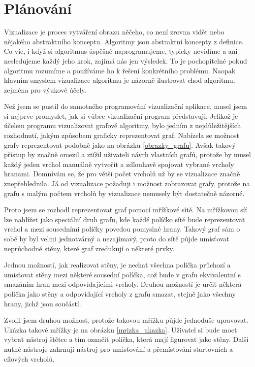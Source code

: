 \documentclass[12pt]{report}			%
\begin{document}

		\chapter{Plánování}
			Vizualizace je proces vytváření obrazu něčeho, co není zrovna vidět nebo nějakého abstraktního konceptu. Algoritmy jsou abstraktní koncepty z definice. Co víc, i když si algoritmus úspěšně naprogramujeme, typicky nevidíme a ani nesledujeme každý jeho krok, zajímá nás jen výsledek. To je pochopitelné pokud algoritmu rozumíme a používáme ho k řešení konkrétního problému. Naopak hlavním smyslem vizualizace algoritmu je názorně ilustrovat chod algoritmu, zejména pro výukové účely.
			
			Než jsem se pustil do samotného programování vizualizační aplikace, musel jsem si nejprve promyslet, jak si vůbec vizualizační program představuji. 
			Jelikož je účelem programu vizualizovat grafové algoritmy, bylo jedním z nejdůležitějších rozhodnutí, jakým způsobem graficky reprezentovat graf. Nabízela se možnost grafy reprezentovat podobně jako na obrázku \ref{obrazky_grafu}. Avšak takový přístup by značně omezil a ztížil uživateli návrh vlastních grafů, protože by musel každý jeden vrchol manuálně vytvořit a zdlouhavě spojovat vybrané vrcholy hranami. Domnívám se, že pro větší počet vrcholů už by se vizualizace značně znepřehlednila. Já od vizualizace požaduji i možnost zobrazovat  grafy, protože na grafu s malým počtem vrcholů by vizualizace nemusely být dostatečně názorné.
			
			Proto jsem se rozhodl reprezentovat graf pomocí mřížkové sítě. Na mřížkovou síť lze nahlížet jako speciální druh grafu, kde každé políčko sítě bude reprezentovat vrchol a mezi sousedními políčky povedou pomyslné hrany. Takový graf sám o sobě by byl velmi jednotvárný a nezajímavý, proto do sítě půjde umísťovat neprůchodné stěny, které graf zredukují o některé prvky. 
			
			Jednou možností, jak realizovat stěny, je nechat všechna políčka průchozí a umisťovat stěny mezi některé sousední políčka, což bude v grafu ekvivalentní s smazáním hran mezi odpovídajícími vrcholy. Druhou možností je určit některá políčka jako stěny a odpovídající vrcholy z grafu smazat, stejně jako všechny hrany, jichž jsou součástí. 
			
			Zvolil jsem druhou možnost, protože takovou mřížku půjde jednoduše upravovat. Ukázka takové mřížky je na obrázku \ref{mrizka_ukazka}. Uživatel si bude moct vybrat nástroj štětce a tím označit políčka, která mají figurovat jako stěny. Další nutné nástroje zahrnují nástroj pro umisťování a přemísťování startovních a cílových vrcholů. 
			
\end{document}

